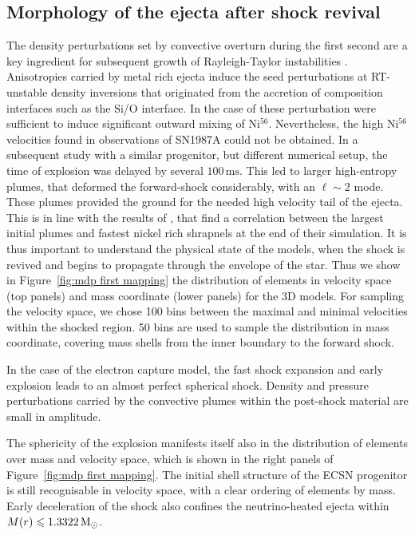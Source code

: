 \documentclass[fleqn,usenatbib]{mnras}
\newcommand{\nickel}{$\mathrm{Ni^{56}}$\xspace}
\newcommand{\solm}{\xspace\ensuremath{\rm{M_{\odot}}}\xspace}
\newcommand{\ms}{\xspace\ensuremath{\text{ms}}}
\begin{document}
\subsection{Morphology of the ejecta after shock revival}
\label{subsec:Morphology of the ejecta after shock revival}

The density perturbations set by convective overturn during the first second are a key ingredient for subsequent growth of Rayleigh-Taylor instabilities \citep{Kifonidis2003}. Anisotropies carried by metal rich ejecta induce the seed perturbations at RT-unstable density inversions that originated from the accretion of composition interfaces such as the Si/O interface. In the case of \citet{Kifonidis2003} these perturbation were sufficient to induce significant outward mixing of \nickel. Nevertheless, the high \nickel velocities found in observations of SN1987A could not be obtained. In a subsequent study with a similar progenitor, but different numerical setup, the time of explosion was delayed by several $100 \,\ms$. This led to larger high-entropy plumes, that deformed the forward-shock considerably, with an  $\ell\sim 2$ mode. These plumes provided the ground for the needed high velocity tail of the ejecta. This is in line with the results of \citet{Wongwathanarat2015}, that find a correlation between the largest initial plumes and fastest nickel rich shrapnels at the end of their simulation. It is thus important to understand the physical state of the models, when the shock is revived and begins to propagate through the envelope of the star. 
Thus we show in Figure~\ref{fig:mdp first mapping} the distribution of elements in velocity space (top panels) and mass coordinate (lower panels) for the 3D models. For sampling the velocity space, we chose 100 bins between the maximal and minimal velocities within the shocked region. 50 bins are used to sample the distribution in mass coordinate, covering mass shells from the inner boundary to the forward shock.

In the case of the electron capture model, the fast shock expansion and early explosion leads to an almost perfect spherical shock. Density and pressure perturbations carried by the convective plumes within the post-shock material are small in amplitude. 

The sphericity of the explosion manifests itself also in the distribution of elements over mass and velocity space, which is shown in the right panels of Figure~\ref{fig:mdp first mapping}. The initial shell structure of the ECSN progenitor is still recognisable in velocity space, with a clear ordering of elements by mass. Early deceleration of the shock also confines the neutrino-heated ejecta within $M(r)\le 1.3322\,\solm$.
\end{document}
